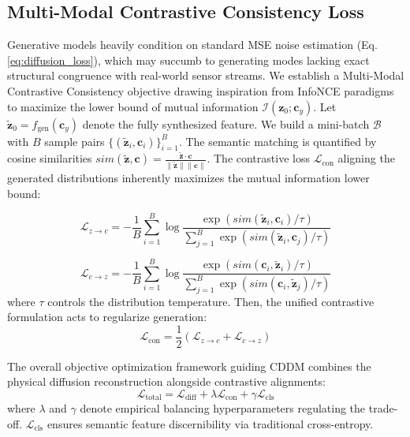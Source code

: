 \subsection{Multi-Modal Contrastive Consistency Loss}
\label{subsec:contrastive_loss}

Generative models heavily condition on standard MSE noise estimation (Eq. \ref{eq:diffusion_loss}), which may succumb to generating modes lacking exact structural congruence with real-world sensor streams. We establish a Multi-Modal Contrastive Consistency objective drawing inspiration from InfoNCE paradigms to maximize the lower bound of mutual information $\mathcal{I}(\mathbf{z}_0; \mathbf{c}_y)$. Let $\tilde{\mathbf{z}}_0 = f_{\text{gen}}(\mathbf{c}_y)$ denote the fully synthesized feature. We build a mini-batch $\mathcal{B}$ with $B$ sample pairs $\{(\tilde{\mathbf{z}}_i, \mathbf{c}_i)\}_{i=1}^B$. The semantic matching is quantified by cosine similarities $sim(\tilde{\mathbf{z}}, \mathbf{c}) = \frac{\tilde{\mathbf{z}} \cdot \mathbf{c}}{\|\tilde{\mathbf{z}}\| \|\mathbf{c}\|}$. The contrastive loss $\mathcal{L}_{\text{con}}$ aligning the generated distributions inherently maximizes the mutual information lower bound:

\begin{equation}\label{eq:contrastive_align_z}
\mathcal{L}_{z \rightarrow c} = - \frac{1}{B} \sum_{i=1}^B \log \frac{\exp\left(sim(\tilde{\mathbf{z}}_i, \mathbf{c}_i) / \tau\right)}{\sum_{j=1}^B \exp\left(sim(\tilde{\mathbf{z}}_i, \mathbf{c}_j) / \tau\right)}
\end{equation}

\begin{equation}\label{eq:contrastive_align_c}
\mathcal{L}_{c \rightarrow z} = - \frac{1}{B} \sum_{i=1}^B \log \frac{\exp\left(sim(\mathbf{c}_i, \tilde{\mathbf{z}}_i) / \tau\right)}{\sum_{j=1}^B \exp\left(sim(\mathbf{c}_i, \tilde{\mathbf{z}}_j) / \tau\right)}
\end{equation}
where $\tau$ controls the distribution temperature. Then, the unified contrastive formulation acts to regularize generation:
\begin{equation}\label{eq:contrastive_total}
\mathcal{L}_{\text{con}} = \frac{1}{2} (\mathcal{L}_{z \rightarrow c} + \mathcal{L}_{c \rightarrow z})
\end{equation}

The overall objective optimization framework guiding CDDM combines the physical diffusion reconstruction alongside contrastive alignments:
\begin{equation}\label{eq:total_objective}
\mathcal{L}_{\text{total}} = \mathcal{L}_{\text{diff}} + \lambda \mathcal{L}_{\text{con}} + \gamma \mathcal{L}_{\text{cls}}
\end{equation}
where $\lambda$ and $\gamma$ denote empirical balancing hyperparameters regulating the trade-off. $\mathcal{L}_{\text{cls}}$ ensures semantic feature discernibility via traditional cross-entropy.

